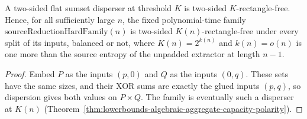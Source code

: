\begin{theorem}
  \label{thm:lowerbounds-threshold-family-rectangle}
  \leanok
  A two-sided flat sumset disperser at threshold $K$ is two-sided
  $K$-rectangle-free. Hence, for all sufficiently large $n$, the fixed
  polynomial-time family $\mathrm{sourceReductionHardFamily}(n)$ is two-sided
  $K(n)$-rectangle-free under every split of its inputs, balanced or not, where
  $K(n)=2^{k(n)}$ and $k(n)=o(n)$ is one more than the source entropy of the
  unpadded extractor at length $n-1$.
\end{theorem}
\begin{proof}
  \leanok
  Embed $P$ as the inputs $(p,0)$ and $Q$ as the inputs $(0,q)$. These sets have
  the same sizes, and their XOR sums are exactly the glued inputs $(p,q)$, so
  dispersion gives both values on $P\times Q$. The family is eventually such a
  disperser at $K(n)$
  (Theorem~\ref{thm:lowerbounds-algebraic-aggregate-capacity-polarity}).
\end{proof}

